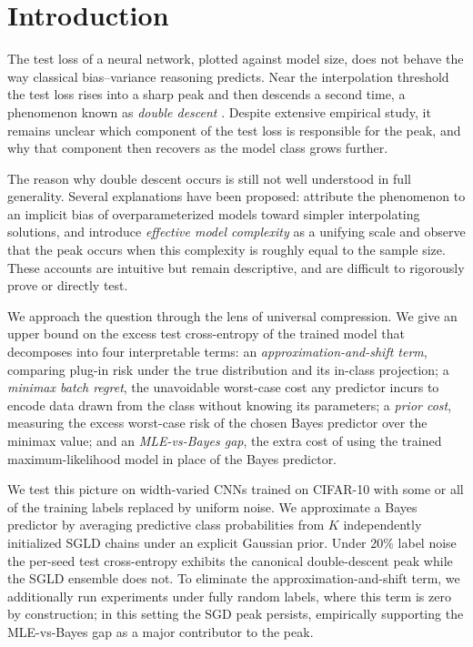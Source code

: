 
\section{Introduction}
\label{sec:intro}

The test loss of a neural network, plotted against model size, does not behave
the way classical bias--variance reasoning predicts. Near the interpolation
threshold the test loss rises into a sharp peak and then descends a second
time, a phenomenon known as \emph{double descent}
\citep{belkin2019reconciling,nakkiran2021deep}. Despite extensive empirical
study, it remains unclear which component of the test loss is responsible for
the peak, and why that component then recovers as the model class grows
further.

The reason why double descent occurs is still not well understood in full
generality. Several explanations have been proposed:
\citet{belkin2019reconciling} attribute the phenomenon to an implicit bias of
overparameterized models toward simpler interpolating solutions, and
\citet{nakkiran2021deep} introduce \emph{effective model complexity} as a
unifying scale and observe that the peak occurs when this complexity is
roughly equal to the sample size. These accounts are intuitive but remain
descriptive, and are difficult to rigorously prove or directly test.

We approach the question through the lens of universal compression. We give
an upper bound on the excess test cross-entropy of the trained model that decomposes
into four interpretable terms: an \emph{approximation-and-shift term},
comparing plug-in risk under the true distribution and its in-class projection;
a \emph{minimax batch regret}, the unavoidable worst-case cost any predictor
incurs to encode data drawn from the class without knowing its parameters;
a \emph{prior cost}, measuring the
excess worst-case risk of the chosen Bayes predictor over the minimax value;
and an \emph{MLE-vs-Bayes gap}, the extra cost of using the trained
maximum-likelihood model in place of the Bayes predictor.

We test this picture on width-varied CNNs trained on CIFAR-10 with some or
all of the training labels replaced by uniform noise. We approximate a
Bayes predictor by averaging predictive class probabilities from
$K$ independently initialized SGLD chains under an explicit Gaussian prior.
Under 20\% label noise the per-seed test cross-entropy exhibits the canonical
double-descent peak while the SGLD ensemble does not. To eliminate the
approximation-and-shift term, we additionally run experiments under fully
random labels, where this term is zero by construction; in this setting the
SGD peak persists, empirically supporting the MLE-vs-Bayes gap as a major
contributor to the peak.

